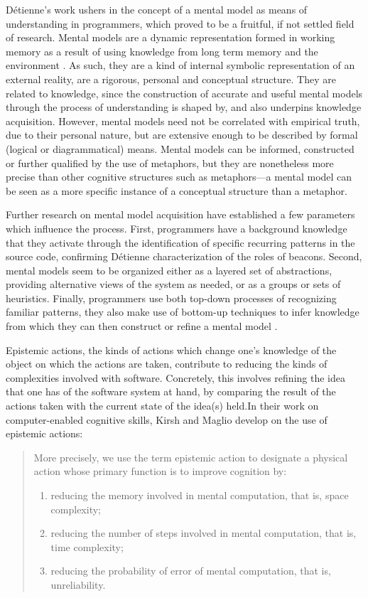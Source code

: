 Détienne's work ushers in the concept of a mental model as means of understanding in programmers, which proved to be a fruitful, if not settled field of research. Mental models are a dynamic representation formed in working memory as a result of using knowledge from long term memory and the environment \citep{canas_role_1998}. As such, they are a kind of internal symbolic representation of an external reality, are a rigorous, personal and conceptual structure. They are related to knowledge, since the construction of accurate and useful mental models through the process of understanding is shaped by, and also underpins knowledge acquisition. However, mental models need not be correlated with empirical truth, due to their personal nature, but are extensive enough to be described by formal (logical or diagrammatical) means. Mental models can be informed, constructed or further qualified by the use of metaphors, but they are nonetheless more precise than other cognitive structures such as metaphors—a mental model can be seen as a more specific instance of a conceptual structure than a metaphor.

Further research on mental model acquisition have established a few parameters which influence the process. First, programmers have a background knowledge that they activate through the identification of specific recurring patterns in the source code, confirming Détienne characterization of the roles of beacons. Second, mental models seem to be organized either as a layered set of abstractions, providing alternative views of the system as needed, or as a groups or sets of heuristics. Finally, programmers use both top-down processes of recognizing familiar patterns, they also make use of bottom-up techniques to infer knowledge from which they can then construct or refine a mental model \citep{heinonen_synthesizing_2023}.

Epistemic actions, the kinds of actions which change one's knowledge of the object on which the actions are taken, contribute to reducing the kinds of complexities involved with software. Concretely, this involves refining the idea that one has of the software system at hand, by comparing the result of the actions taken with the current state of the idea(s) held.In their work on computer-enabled cognitive skills, Kirsh and Maglio develop on the use of epistemic actions:

\begin{quote}
    More precisely, we use the term epistemic action to designate a physical action whose primary function is to improve cognition by:
    \begin{enumerate}
        \item{reducing the memory involved in mental computation, that is, space complexity;}
        \item{reducing the number of steps involved in mental computation, that is, time complexity;}
        \item{reducing the probability of error of mental computation, that is, unreliability.}
    \end{enumerate}
    \citep{kirsh_distinguishing_1994}
\end{quote}

